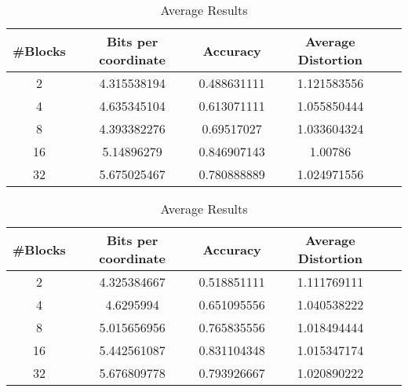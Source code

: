 \begin{table}[h!]
	\centering
	\caption{Average Results \sift{} \qs{}}
	\label{table:avg_sift_qs}
	\begin{tabular}{ccccc}
		\hline
		\#Blocks & Bits per coordinate & Accuracy  & Average Distortion \\ \hline
		2 & 4.315538194	& 0.488631111 & 1.121583556  \\
		4 & 4.635345104 & 0.613071111 & 1.055850444  \\
		8 & 4.393382276 & 0.69517027 & 1.033604324 \\
		16 & 5.14896279 & 0.846907143 & 1.00786 \\
		32 & 5.675025467 & 0.780888889 & 1.024971556 \\
		\hline
	\end{tabular}
\end{table}

\begin{table}[h!]
	\centering
	\caption{Average Results \sift{} \qsr{}}
	\label{table:avg_sift_qsr}
	\begin{tabular}{ccccc}
		\hline
		\#Blocks & Bits per coordinate & Accuracy  & Average Distortion \\ \hline
		2 & 4.325384667	& 0.518851111 & 1.111769111  \\
		4 & 4.6295994 & 0.651095556 & 1.040538222  \\
		8 & 5.015656956 & 0.765835556 & 1.018494444 \\
		16 & 5.442561087 & 0.831104348 & 1.015347174 \\
		32 & 5.676809778 & 0.793926667 & 1.020890222 \\
		\hline
	\end{tabular}
\end{table}
